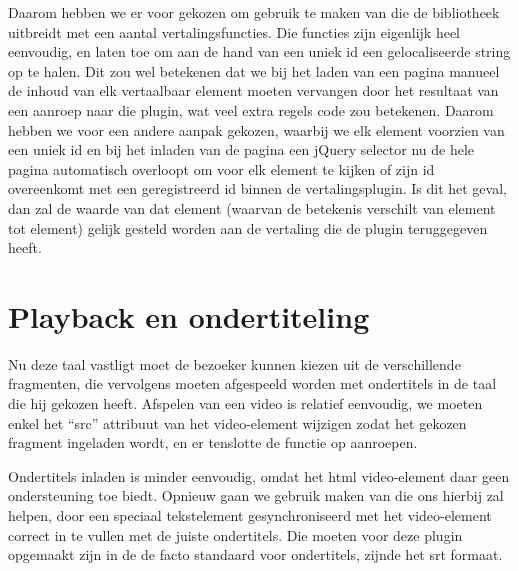 Daarom hebben we er voor gekozen om gebruik te maken van  die de bibliotheek uitbreidt met een aantal vertalingsfuncties. Die functies zijn eigenlijk heel eenvoudig, en laten toe om aan de hand van een uniek id een gelocaliseerde string op te halen. Dit zou wel betekenen dat we bij het laden van een pagina manueel de inhoud van elk vertaalbaar element moeten vervangen door het resultaat van een aanroep naar die plugin, wat veel extra regels code zou betekenen. Daarom hebben we voor een andere aanpak gekozen, waarbij we elk element voorzien van een uniek id en bij het inladen van de pagina een jQuery selector nu de hele pagina automatisch overloopt om voor elk element te kijken of zijn id overeenkomt met een geregistreerd id binnen de vertalingsplugin. Is dit het geval, dan zal de waarde van dat element (waarvan de betekenis verschilt van element tot element) gelijk gesteld worden aan de vertaling die de plugin teruggegeven heeft.

\section{Playback en ondertiteling}
\label{voorstellingen:metavoorstelling:playback}

Nu deze taal vastligt moet de bezoeker kunnen kiezen uit de verschillende fragmenten, die vervolgens moeten afgespeeld worden met ondertitels in de taal die hij gekozen heeft. Afspelen van een video is relatief eenvoudig, we moeten enkel het ``src'' attribuut van het video-element wijzigen zodat het gekozen fragment ingeladen wordt, en er tenslotte de  functie op aanroepen.

Ondertitels inladen is minder eenvoudig, omdat het \ac{html} video-element daar geen ondersteuning toe biedt. Opnieuw gaan we gebruik maken van  die ons hierbij zal helpen, door een speciaal tekstelement gesynchroniseerd met het video-element correct in te vullen met de juiste ondertitels. Die moeten voor deze plugin opgemaakt zijn in de de facto standaard voor ondertitels, zijnde het \ac{srt} formaat.
